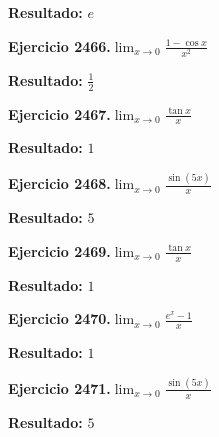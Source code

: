 \documentclass[10pt,a4paper]{article}
\begin{document}
\begin{solbox}
\textbf{Resultado:} \(\displaystyle e\)
\end{solbox}

\newpage
\begin{ejbox}
\textbf{Ejercicio 2466.}\quad $\lim_{x\to 0} \frac{1-\cos x}{x^2}$
\end{ejbox}

\begin{solbox}
\textbf{Resultado:} \(\displaystyle \frac{1}{2}\)
\end{solbox}

\begin{ejbox}
\textbf{Ejercicio 2467.}\quad $\lim_{x\to 0} \frac{\tan x}{x}$
\end{ejbox}

\begin{solbox}
\textbf{Resultado:} \(\displaystyle 1\)
\end{solbox}

\begin{ejbox}
\textbf{Ejercicio 2468.}\quad $\lim_{x\to 0} \frac{\sin(5x)}{x}$
\end{ejbox}

\begin{solbox}
\textbf{Resultado:} \(\displaystyle 5\)
\end{solbox}

\newpage
\begin{ejbox}
\textbf{Ejercicio 2469.}\quad $\lim_{x\to 0} \frac{\tan x}{x}$
\end{ejbox}

\begin{solbox}
\textbf{Resultado:} \(\displaystyle 1\)
\end{solbox}

\begin{ejbox}
\textbf{Ejercicio 2470.}\quad $\lim_{x\to 0} \frac{e^x-1}{x}$
\end{ejbox}

\begin{solbox}
\textbf{Resultado:} \(\displaystyle 1\)
\end{solbox}

\begin{ejbox}
\textbf{Ejercicio 2471.}\quad $\lim_{x\to 0} \frac{\sin(5x)}{x}$
\end{ejbox}

\begin{solbox}
\textbf{Resultado:} \(\displaystyle 5\)
\end{solbox}
\end{document}
